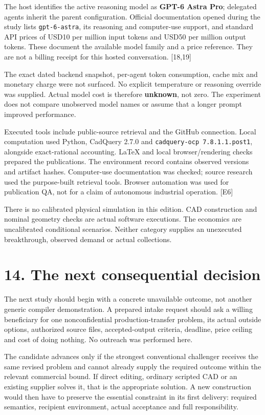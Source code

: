 \documentclass[11pt,letterpaper]{article}
\begin{document}
The host identifies the active reasoning model as \textbf{GPT-6 Astra Pro}; delegated agents inherit the parent configuration. Official documentation opened during the study lists \nolinkurl{gpt-6-astra}, its reasoning and computer-use support, and standard API prices of USD10 per million input tokens and USD50 per million output tokens. These document the available model family and a price reference. They are not a billing receipt for this hosted conversation. {[}18,19{]}

The exact dated backend snapshot, per-agent token consumption, cache mix and monetary charge were not surfaced. No explicit temperature or reasoning override was supplied. Actual model cost is therefore \textbf{unknown}, not zero. The experiment does not compare unobserved model names or assume that a longer prompt improved performance.

Executed tools include public-source retrieval and the GitHub connection. Local computation used Python, CadQuery 2.7.0 and \nolinkurl{cadquery-ocp 7.8.1.1.post1}, alongside exact-rational accounting. LaTeX and local browser/rendering checks prepared the publications. The environment record contains observed versions and artifact hashes. Computer-use documentation was checked; source research used the purpose-built retrieval tools. Browser automation was used for publication QA, not for a claim of autonomous industrial operation. {[}E6{]}

There is no calibrated physical simulation in this edition. CAD construction and nominal geometry checks are actual software executions. The economics are uncalibrated conditional scenarios. Neither category supplies an unexecuted breakthrough, observed demand or actual collections.

\hypertarget{the-next-consequential-decision}{%
\section{14. The next consequential decision}\label{the-next-consequential-decision}}

The next study should begin with a concrete unavailable outcome, not another generic compiler demonstration. A prepared intake request should ask a willing beneficiary for one nonconfidential production-transfer problem, its actual outside options, authorized source files, accepted-output criteria, deadline, price ceiling and cost of doing nothing. No outreach was performed here.

The candidate advances only if the strongest conventional challenger receives the same revised problem and cannot already supply the required outcome within the relevant commercial bound. If direct editing, ordinary scripted CAD or an existing supplier solves it, that is the appropriate solution. A new construction would then have to preserve the essential constraint in its first delivery: required semantics, recipient environment, actual acceptance and full responsibility.
\end{document}
